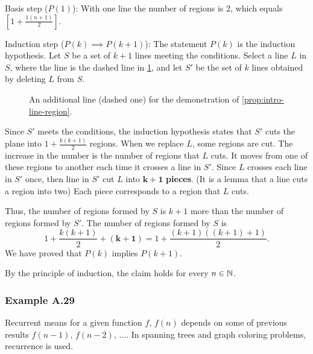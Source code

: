 \documentclass[../src/handouts/main.tex]{subfiles}
\begin{document}
Basis step ($P(1)$): With one line the number of regions is 2, which equals $\left[ 1 + \frac{1 (n + 1)}{2} \right]$.

Induction step ($P(k) \implies P(k + 1)$): The statement $P(k)$ is the induction hypothesis. Let $S$ be a set of $k + 1$ lines meeting the conditions. Select a line $L$ in $S$, where the line is the dashed line in \cref{fig:intro-line-region-additional}, and let $S'$ be the set of $k$ lines obtained by deleting $L$ from $S$.

\begin{figure}[ht]
  \centering
  \caption{An additional line (dashed one) for the demonstration of \cref{prop:intro-line-region}.}
  \label{fig:intro-line-region-additional}
\end{figure}

Since $S'$ meets the conditions, the induction hypothesis states that $S'$ cuts the plane into $1 + \frac{k (k + 1)}{2}$ regions.
When we replace $L$, some regions are cut.
The increase in the number is the number of regions that $L$ cuts. It moves from one of these regions to another each time it crosses a line in $S'$.
Since $L$ crosses each line in $S'$ once, then line in $S'$ cut $L$ into $\bm{k + 1}$ \textbf{pieces}. (It is a lemma that a line cuts a region into two)
Each piece corresponds to a region that $L$ cuts.

Thus, the number of regions formed by $S$ is $k + 1$ more than the number of regions formed by $S'$.
The number of regions formed by $S$ is
$$
  1 + \frac{k (k + 1)}{2} + \bm{(k + 1)} = 1 + \frac{(k + 1)((k + 1) + 1)}{2}.
$$
We have proved that $P(k)$ implies $P(k + 1)$.

By the principle of induction, the claim holds for every $n \in \mathbb{N}$.


\subsubsection{Example A.29}

Recurrent means for a given function $f$, $f(n)$ depends on some of previous results $f(n - 1),\, f(n - 2),\, \ldots$. In spanning trees and graph coloring problems, recurrence is used.
\end{document}
